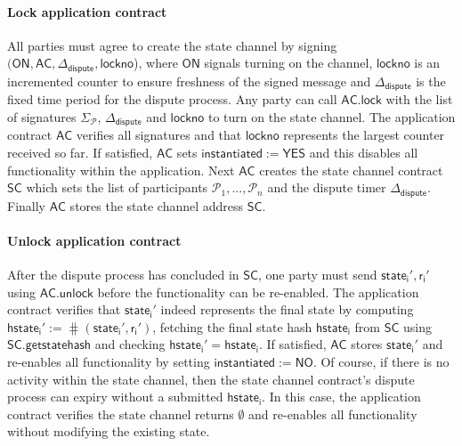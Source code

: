 \documentclass{llncs}
\newcommand{\instantiated}{\mathsf{instantiated}}
\newcommand{\instantiatedno}{\mathsf{NO}}
\newcommand{\instantiatedyes}{\mathsf{YES}}
\newcommand{\chanon}{\mathsf{ON}}
\newcommand{\hstatei}{\mathsf{hstate}_{\monotoniccounter}}
\newcommand{\monotoniccounter}{\mathsf{i}}
\newcommand{\stateinfoi}{\mathsf{state}_{\mathsf{i}}}
\newcommand{\participant}{\mathcal{P}}
\newcommand{\rani}{\mathsf{r}_{\mathsf{i}}}
\newcommand{\statechannel}{\mathsf{SC}}
\newcommand{\statechannelgetcommitment}{\mathsf{SC}.\mathsf{getstatehash}}
\newcommand{\appcontract}{\mathsf{AC}}
\newcommand{\applock}{\mathsf{AC.lock}}
\newcommand{\appunlock}{\mathsf{AC.unlock}}
\newcommand{\timerdispute}{\mathsf{\Delta}_{\mathsf{dispute}}}
\begin{document}
	
	
	\paragraph{Lock application contract} All parties must agree to create the state channel by signing $(\chanon, \appcontract, \timerdispute, \mathsf{lockno}$), where $\chanon$ signals turning on the channel, $\mathsf{lockno}$ is an incremented counter to ensure freshness of the signed message and $\timerdispute$ is the fixed time period for the dispute process. 
	Any party can call $\applock$ with the list of signatures $\Sigma_{\participant}$, $\timerdispute$ and $\mathsf{lockno}$ to turn on the state channel. 
	The application contract $\appcontract$ verifies all signatures and that $\mathsf{lockno}$ represents the largest counter received so far.
	If satisfied, $\appcontract$ sets  $\instantiated := \instantiatedyes$ and this disables all functionality within the application.
	Next $\appcontract$ creates the state channel contract $\statechannel$ which sets the list of participants $\participant_{1},...,\participant_{n}$ and the dispute timer $\timerdispute$. 
	Finally $\appcontract$ stores the state channel address $\statechannel$. 
	
	
	\paragraph{Unlock application contract}
	
	After the dispute process has concluded in $\statechannel$, one party must send  $\stateinfoi',\rani'$ using $\appunlock$ before the functionality can be re-enabled.
	The application contract verifies that $\stateinfoi'$  indeed represents the final state by computing $\hstatei' := \hash(\stateinfoi', \rani')$, fetching the final state hash $\hstatei$ from $\statechannel$ using $\statechannelgetcommitment$ and checking  $\hstatei' = \hstatei$. 
	If satisfied, $\appcontract$ stores $\stateinfoi'$ and re-enables all functionality by setting $\instantiated :=  \instantiatedno$. 
	Of course, if there is no activity within the state channel, then the state channel contract's dispute process can expiry without a submitted $\hstatei$.
	In this case, the application contract verifies the state channel returns $\emptyset$ and re-enables all functionality without modifying the existing state. 
	
	
	
\end{document}
